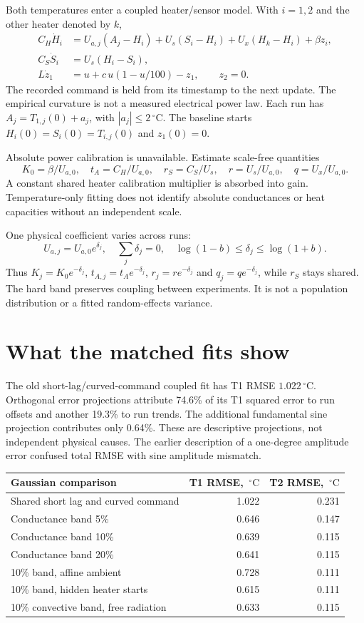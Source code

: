 \documentclass[10pt,letterpaper]{article}
\newcommand{\C}{\,^\circ\mathrm{C}}
\begin{document}
Both temperatures enter a coupled heater/sensor model. With $i=1,2$ and the
other heater denoted by $k$,
\begin{align}
 C_H\dot H_i &= U_{a,j}(A_j-H_i)+U_s(S_i-H_i)
                 +U_x(H_k-H_i)+\beta z_i,\\
 C_S\dot S_i &= U_s(H_i-S_i),\\
 L\dot z_1 &= u+c\,u(1-u/100)-z_1,\qquad z_2=0.
\end{align}
The recorded command is held from its timestamp to the next update.
The empirical curvature is not a measured electrical power law.
Each run has $A_j=T_{1,j}(0)+a_j$, with $|a_j|\leq2\C$.
The baseline starts $H_i(0)=S_i(0)=T_{i,j}(0)$ and $z_1(0)=0$.

Absolute power calibration is unavailable. Estimate scale-free quantities
\[
 K_0=\beta/U_{a,0},\quad t_A=C_H/U_{a,0},\quad
 r_S=C_S/U_s,\quad r=U_s/U_{a,0},\quad q=U_x/U_{a,0}.
\]
A constant shared heater calibration multiplier is absorbed into gain.
Temperature-only fitting does not identify absolute conductances or heat
capacities without an independent scale.

One physical coefficient varies across runs:
\[
 U_{a,j}=U_{a,0}e^{\delta_j},\quad \sum_j\delta_j=0,\quad
 \log(1-b)\leq\delta_j\leq\log(1+b).
\]
Thus $K_j=K_0e^{-\delta_j}$, $t_{A,j}=t_Ae^{-\delta_j}$,
$r_j=re^{-\delta_j}$ and $q_j=qe^{-\delta_j}$, while $r_S$ stays shared.
The hard band preserves coupling between experiments. It is not a
population distribution or a fitted random-effects variance.

\section{What the matched fits show}
The old short-lag/curved-command coupled fit has T1 RMSE $1.022\C$.
Orthogonal error projections attribute 74.6\% of its T1 squared error to
run offsets and another 19.3\% to run trends. The additional fundamental
sine projection contributes only 0.64\%. These are descriptive projections,
not independent physical causes. The earlier description of a one-degree
amplitude error confused total RMSE with sine amplitude mismatch.

\begin{tabularx}{\linewidth}{@{}Xrr@{}}
\toprule
Gaussian comparison & T1 RMSE, $\C$ & T2 RMSE, $\C$\\
\midrule
Shared short lag and curved command & 1.022 & 0.231\\
Conductance band 5\% & 0.646 & 0.147\\
Conductance band 10\% & 0.639 & 0.115\\
Conductance band 20\% & 0.641 & 0.115\\
10\% band, affine ambient & 0.728 & 0.111\\
10\% band, hidden heater starts & 0.615 & 0.111\\
10\% convective band, free radiation & 0.633 & 0.115\\
\bottomrule
\end{tabularx}
\end{document}
